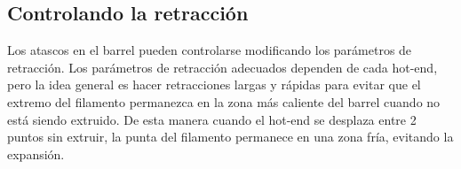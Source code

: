 \documentclass[11pt,a4paper]{article}
\begin{document}
	\subsection{Controlando la retracción}
Los atascos en el barrel pueden controlarse modificando los parámetros de retracción. Los parámetros de retracción adecuados dependen de cada hot-end, pero la idea general es hacer retracciones largas y rápidas para evitar que el extremo del filamento permanezca en la zona más caliente del barrel cuando no está siendo extruido. De esta manera cuando el hot-end se desplaza entre 2 puntos sin extruir, la punta del filamento permanece en una zona fría, evitando la expansión.\\\\
	\begin{description}
		\item[]  
		\item[]  
	\end{description}
\end{document}

